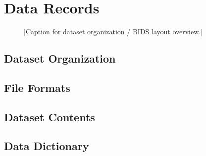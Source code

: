 \section{Data Records}
\label{sec:data_records}


\begin{figure}[htbp]
    \centering
    \caption{[Caption for dataset organization / BIDS layout overview.]}
    \label{fig:dataset_organization}
\end{figure}

\subsection{Dataset Organization}



\subsection{File Formats}



\subsection{Dataset Contents}



\subsection{Data Dictionary}


